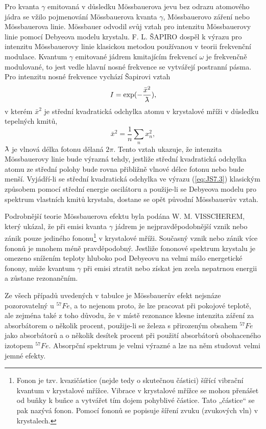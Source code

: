\documentclass[../../main.tex]{subfiles}
\begin{document}
Pro kvanta $\gamma$ emitovaná v důsledku Mössbauerova jevu bez odrazu atomového jádra se vžilo pojmenování Mössbauerova kvanta $\gamma$, Mössbauerovo záření nebo Mössbauerova linie. Mössbauer odvodil svůj vztah pro intenzitu Mössbauerovy linie pomocí Debyeova modelu krystalu. F. L. ŠAPIRO dospěl k výrazu pro intenzitu Mössbauerovy linie klasickou metodou používanou v teorii frekvenční modulace. Kvantum $\gamma$ emitované jádrem kmitajícím frekvencí $\omega$ je frekvenčně modulované, to jest vedle hlavní nosné frekvence se vytvářejí postranní pásma. Pro intenzitu nosné frekvence vychází Šapirovi vztah
\begin{equation}\label{eq:JS7.3}
I = \exp (- \dfrac{\bar{x}^2}{\lambdabar}),
\end{equation}
v kterém $\bar{x}^2$ je střední kvadratická odchylka atomu v krystalové mříži v důsledku tepelných kmitů,
\begin{equation}
 \bar{x}^2 = \dfrac{1}{n} \sum_n x_{n}^{2},
\end{equation}
$\lambdabar$ je vlnová délka fotonu dělaná $2 \pi$. Tento vztah ukazuje, že intenzita Mössbauerovy
linie bude výrazná tehdy, jestliže střední kvadratická odchylka atomu ze střední polohy bude rovna přibližně vlnové délce fotonu nebo bude menší. Vyjádří-li se střední kvadratická odchylka ve výrazu (\ref{eq:JS7.3}) klasickým způsobem pomocí střední energie oscilátoru a použije-li se Debyeova modelu pro spektrum vlastních kmitů krystalu, dostane se opět původní Mössbauerův vztah.

Podrobnější teorie Mössbauerova efektu byla podána W. M. VISSCHEREM, který ukázal, že při emisi kvanta $\gamma$ jádrem je nejpravděpodobnější vznik nebo zánik pouze jediného fononu\footnote{Fonon je tzv. kvazičástice (nejde tedy o skutečnou částici) šířící vibrační kvantum v krystalové mřížce. Vibrace v krystalové mřížce se mohou přenášet od buňky k buňce a vytvářet tím dojem pohyblivé částice. Tato „částice“ se pak nazývá fonon. Pomocí fononů se popisuje šíření zvuku (zvukových vln) v krystalech.} v krystalové mříži. Současný vznik nebo zánik více fononů je mnohem méně pravděpodobný. Jestliže fononové spektrum krystalu je omezeno snížením teploty hluboko pod Debyeovu na velmi málo energetické fonony, může kvantum $\gamma$ při emisi ztratit nebo získat jen zcela nepatrnou energii a zůstane rezonančním.

Ze všech případů uvedených v tabulce je Mössbauerův efekt nejsnáze pozorovatelný u $^{57}Fe$, a to nejenom proto, že lze pracovat při pokojové teplotě, ale zejména také z toho důvodu, že v místě rezonance klesne intenzita záření za absorbátorem o několik procent, použije-li se železa s přirozeným obsahem $^{57}Fe$ jako absorbátorů a o několik desítek procent při použití absorbátorů obohaceného izotopem $^{57}Fe$. Absorpční spektrum je velmi výrazné a lze na něm studovat velmi jemné efekty.
\end{document}
